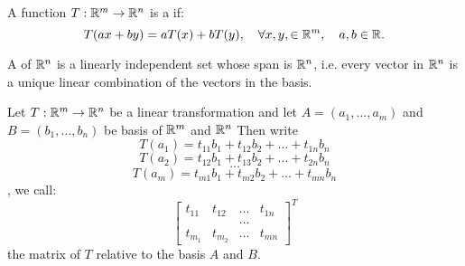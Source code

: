 \documentclass[../main/main.tex]{subfiles}
\begin{document}
\begin{definition}
    A function $T: \mathbb{R}^{m}\to  \mathbb{R}^{n}$ is a  if: \[
       T(ax+by) = aT(x) + bT(y),\quad  \forall x,y,\in \mathbb{R}^{m}, \quad a,b \in \mathbb{R}
   .\] 
\end{definition}

\begin{definition}
    A  of $ \mathbb{R}^{n}$ is a linearly independent set whose span is $ \mathbb{R}^{n}$, i.e. every vector in $ \mathbb{R}^{n}$ is a unique linear combination of the vectors in the basis.
\end{definition}

\begin{definition}
    Let $T: \mathbb{R}^{m} \to \mathbb{R}^{n}$ be a linear transformation and let $A = (a_1,\ldots,a_m)$ and $B = (b_1,\ldots,b_n)$ be basis of $\mathbb{R}^{m}$ and $ \mathbb{R}^{n}$ Then write \[
        T(a_1) = t_{11}b_1 + t_{12}b_2 + \ldots + t_{1n}b_n
    \] \[ 
        T(a_2) = t_{12}b_1 + t_{13}b_2 + \ldots + t_{2n}b_n
    \] \[
    \ldots
    \] \[ 
        T(a_m) = t_{m1}b_1 + t_{m2}b_2 + \ldots + t_{mn}b_n
    \], we call: \[
    \begin{bmatrix} t_{11} &t_{12}&\ldots &t_{1n}\\
    & &\ldots & \\
        t_{m_1} &t_{m_2} &\ldots &t_{mn}
    \end{bmatrix}^{T} 
    \] the matrix of $T$ relative to the basis $A$ and $B$.
\end{definition}
\end{document}
